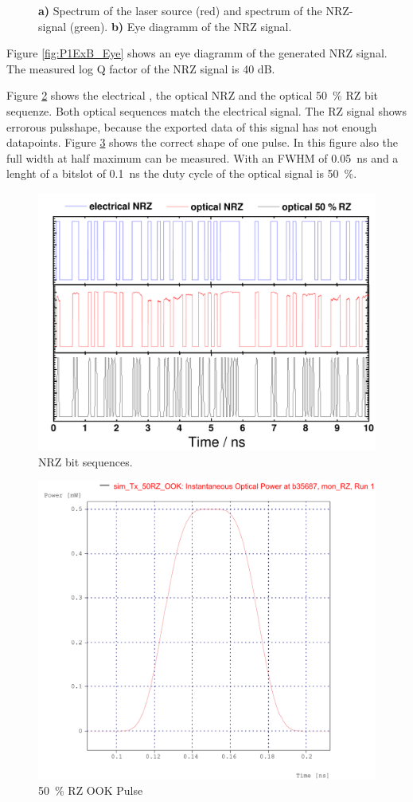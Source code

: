 \begin{figure}
\caption{\textbf{a)} Spectrum of the laser source (red) and spectrum of the NRZ-signal (green). \textbf{b)} Eye diagramm of the NRZ signal.}%
\label{fig:P1ExB_1}%
\end{figure}

Figure \ref{fig:P1ExB_Eye} shows an eye diagramm of the generated NRZ signal. 
 The measured log Q factor of the NRZ signal is 40 dB.

Figure \ref{fig:P1ExB_bit} shows the electrical , the optical NRZ  and the optical 50~\% RZ bit sequenze. Both optical sequences match the electrical signal. The RZ signal shows errorous pulsshape, because the exported data of this signal has not enough datapoints. Figure \ref{fig:P1ExB_FWHM} shows the correct shape of one pulse. In this figure also the full width at half maximum can be measured. With an FWHM of 0.05~ns and a lenght of a bitslot of 0.1~ns the duty cycle of the optical signal is 50~\%.

\begin{figure}%
\centering
\includegraphics[width=.8\columnwidth]{Grafiken/P1ExB_BitSequence.pdf}%
\caption{NRZ bit sequences.}%
\label{fig:P1ExB_bit}%
\end{figure}

\begin{figure}%
\centering
\includegraphics[width=.5\columnwidth]{Grafiken/P1ExB_FWHM.pdf}%
\caption{50~\% RZ OOK Pulse}%
\label{fig:P1ExB_FWHM}%
\end{figure}

